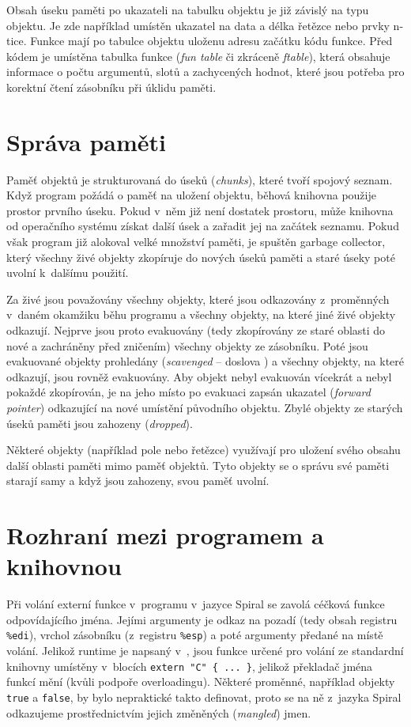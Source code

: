 Obsah úseku paměti po ukazateli na tabulku objektu je již závislý na typu
objektu. Je zde například umístěn ukazatel na data a délka řetězce nebo prvky
n-tice. Funkce mají po tabulce objektu uloženu adresu začátku kódu funkce. Před
kódem je umístěna tabulka funkce (\emph{fun table} či zkráceně \emph{ftable}),
která obsahuje informace o počtu argumentů, slotů a zachycených hodnot, které
jsou potřeba pro korektní čtení zásobníku při úklidu paměti.

\section{Správa paměti}

Paměť objektů je strukturovaná do úseků (\emph{chunks}), které tvoří spojový
seznam. Když program požádá o paměť na uložení objektu, běhová knihovna použije
prostor prvního úseku. Pokud v~něm již není dostatek prostoru, může knihovna od
operačního systému získat další úsek a zařadit jej na začátek seznamu. Pokud
však program již alokoval velké množství paměti, je spuštěn garbage collector,
který všechny živé objekty zkopíruje do nových úseků paměti a staré úseky poté
uvolní k~dalšímu použití.

Za živé jsou považovány všechny objekty, které jsou odkazovány z~proměnných
v~daném okamžiku běhu programu a všechny objekty, na které jiné živé objekty
odkazují. Nejprve jsou proto evakuovány (tedy zkopírovány ze staré oblasti do
nové a zachráněny před zničením) všechny objekty ze zásobníku. Poté jsou
evakuované objekty prohledány (\emph{scavenged} -- doslova ) a všechny objekty, na které odkazují, jsou rovněž evakuovány. Aby
objekt nebyl evakuován vícekrát a nebyl pokaždé zkopírován, je na jeho místo po
evakuaci zapsán ukazatel (\emph{forward pointer}) odkazující na nové umístění
původního objektu. Zbylé objekty ze starých úseků paměti jsou zahozeny
(\emph{dropped}).

Některé objekty (například pole nebo řetězce) využívají pro uložení svého obsahu
další oblasti paměti mimo paměť objektů. Tyto objekty se o správu své paměti
starají samy a když jsou zahozeny, svou paměť uvolní.

\section{Rozhraní mezi programem a knihovnou}

Při volání externí funkce v~programu v~jazyce Spiral se zavolá céčková funkce
odpovídajícího jména. Jejími argumenty je odkaz na pozadí (tedy obsah registru
\texttt{\%edi}), vrchol zásobníku (z~registru \texttt{\%esp}) a poté argumenty
předané na místě volání. Jelikož runtime je napsaný v~\Cplusplus{}, jsou
funkce určené pro volání ze standardní knihovny umístěny v~blocích
\texttt{extern "C"~\{ ... \}}, jelikož překladač \Cplusplus{} jména funkcí
mění (kvůli podpoře overloadingu). Některé proměnné, například objekty
\texttt{true} a \texttt{false}, by bylo nepraktické takto definovat, proto se
na ně z~jazyka Spiral odkazujeme prostřednictvím jejich změněných
(\emph{mangled}) jmen.
